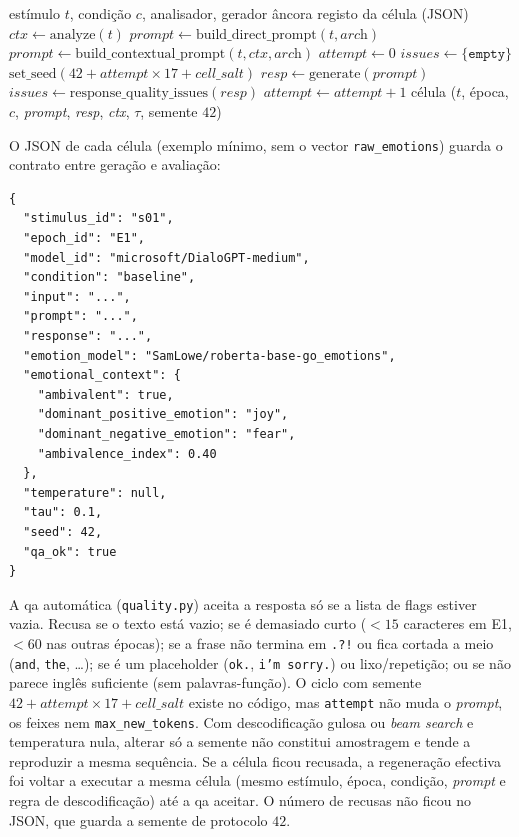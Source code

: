 \begin{algorithm}[H]
\caption{Geração de uma célula (\texttt{run\_cell}).}
\label{alg:run_cell}
\begin{algorithmic}[1]
\Require estímulo \(t\), condição \(c\), analisador, gerador âncora
\Ensure registo da célula (JSON)
\State \(\textit{ctx} \gets \mathrm{analyze}(t)\) 
  \State \(\textit{prompt} \gets \mathrm{build\_direct\_prompt}(t, \textit{arch})\)
\Else
  \State \(\textit{prompt} \gets \mathrm{build\_contextual\_prompt}(t, \textit{ctx}, \textit{arch})\)
\EndIf
\State \(\textit{attempt} \gets 0\)
\State \(\textit{issues} \gets \{\texttt{empty}\}\)
  \State \(\mathrm{set\_seed}(42 + \textit{attempt}\times 17 + \textit{cell\_salt})\) 
  \State \(\textit{resp} \gets \mathrm{generate}(\textit{prompt})\)
  \State \(\textit{issues} \gets \mathrm{response\_quality\_issues}(\textit{resp})\)
  \State \(\textit{attempt} \gets \textit{attempt}+1\) 
\EndWhile
\State \Return célula (\(t\), época, \(c\), \textit{prompt}, \textit{resp}, \textit{ctx}, \(\tau\), semente \(42\))
\end{algorithmic}
\end{algorithm}

O JSON de cada célula (exemplo mínimo, sem o vector \texttt{raw\_emotions}) guarda o contrato entre geração e avaliação:

\begin{verbatim}
{
  "stimulus_id": "s01",
  "epoch_id": "E1",
  "model_id": "microsoft/DialoGPT-medium",
  "condition": "baseline",
  "input": "...",
  "prompt": "...",
  "response": "...",
  "emotion_model": "SamLowe/roberta-base-go_emotions",
  "emotional_context": {
    "ambivalent": true,
    "dominant_positive_emotion": "joy",
    "dominant_negative_emotion": "fear",
    "ambivalence_index": 0.40
  },
  "temperature": null,
  "tau": 0.1,
  "seed": 42,
  "qa_ok": true
}
\end{verbatim}

A \gls{qa} automática (\texttt{quality.py}) aceita a resposta só se a lista de flags estiver vazia. Recusa se o texto está vazio; se é demasiado curto (\(<15\) caracteres em E1, \(<60\) nas outras épocas); se a frase não termina em \texttt{.?!} ou fica cortada a meio (\texttt{and}, \texttt{the}, \ldots); se é um placeholder (\texttt{ok.}, \texttt{i'm sorry.}) ou lixo/repetição; ou se não parece inglês suficiente (sem palavras-função). O ciclo com semente \(42 + \textit{attempt}\times 17 + \textit{cell\_salt}\) existe no código, mas \texttt{attempt} não muda o \textit{prompt}, os feixes nem \texttt{max\_new\_tokens}. Com descodificação gulosa ou \textit{beam search} e temperatura nula, alterar só a semente não constitui amostragem e tende a reproduzir a mesma sequência. Se a célula ficou recusada, a regeneração efectiva foi voltar a executar a mesma célula (mesmo estímulo, época, condição, \textit{prompt} e regra de descodificação) até a \gls{qa} aceitar. O número de recusas não ficou no JSON, que guarda a semente de protocolo \(42\).

